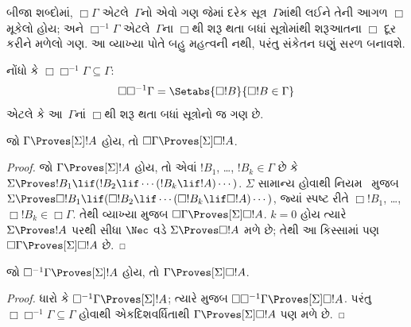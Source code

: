 બીજા શબ્દોમાં, $\Box\Gamma$ એટલે~$\Gamma$નો એવો ગણ જેમાં
દરેક સૂત્ર~$\Gamma$માંથી લઈને તેની આગળ $\Box$ મૂકેલો હોય;
અને $\Box^{-1}\Gamma$ એટલે~$\Gamma$ના
$\Box$થી શરૂ થતા બધાં સૂત્રોમાંથી શરૂઆતના $\Box$ દૂર કરીને
મળેલો ગણ. આ વ્યાખ્યા પોતે બહુ મહત્વની નથી, પરંતુ સંકેતન ઘણું સરળ
બનાવશે.

નોંધો કે $\Box\Box^{-1}\Gamma \subseteq \Gamma$:
\[
\Box\Box^{-1}\Gamma = \Setabs{\Box!B}{\Box!B \in \Gamma}
\]
એટલે કે આ~$\Gamma$નાં $\Box$થી શરૂ થતા બધાં સૂત્રોનો જ ગણ છે.

\begin{lem}
  જો $\Gamma \Proves[\Sigma] !A$ હોય, તો $\Box\Gamma
  \Proves[\Sigma] \Box !A$.
\end{lem}

\begin{proof}
  જો $\Gamma \Proves[\Sigma] !A$ હોય, તો એવાં $!B_1$, \dots,
  $!B_k \in \Gamma$ છે કે $\Sigma \Proves !B_1 \lif (!B_2 \lif
  \cdots (!B_k \lif !A)\cdots)$. $\Sigma$ સામાન્ય હોવાથી
  નિયમ~\RK{} મુજબ $\Sigma \Proves \Box!B_1 \lif (\Box!B_2 \lif
  \cdots (\Box!B_k \lif \Box!A)\cdots)$, જ્યાં સ્પષ્ટ રીતે
  $\Box!B_1$, \dots, $\Box!B_k \in \Box\Gamma$. તેથી વ્યાખ્યા મુજબ
  $\Box\Gamma \Proves[\Sigma] \Box !A$.
  $k=0$ હોય ત્યારે $\Sigma \Proves !A$ પરથી સીધા $\Nec$ વડે
  $\Sigma \Proves \Box !A$ મળે છે; તેથી આ કિસ્સામાં પણ
  $\Box\Gamma \Proves[\Sigma] \Box !A$ છે.
\end{proof}

\begin{lem}
  જો $\Box^{-1} \Gamma \Proves[\Sigma] !A$ હોય, તો $\Gamma
  \Proves[\Sigma] \Box!A$.
\end{lem}

\begin{proof}
  ધારો કે $\Box^{-1}\Gamma \Proves[\Sigma] !A$; ત્યારે
   મુજબ $\Box\Box^{-1}\Gamma \Proves[\Sigma] \Box!A$.
  પરંતુ $\Box\Box^{-1}\Gamma \subseteq \Gamma$ હોવાથી
  એકદિશવર્ધિતાથી $\Gamma \Proves[\Sigma] \Box!A$ પણ મળે છે.
\end{proof}


